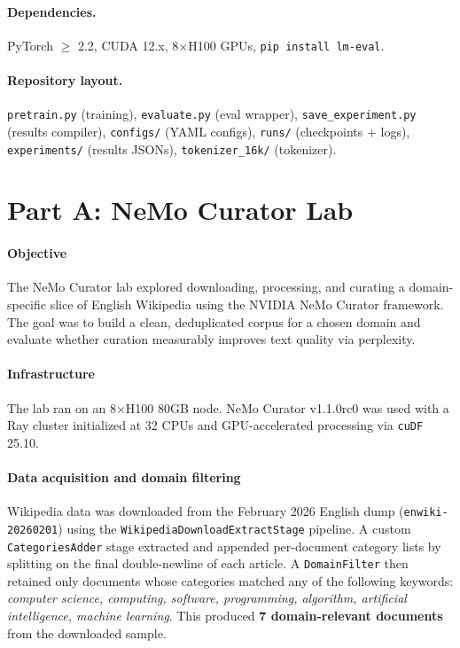 \documentclass[10pt]{article}
\begin{document}
\paragraph{Dependencies.}
PyTorch $\geq$ 2.2, CUDA 12.x, 8$\times$H100 GPUs, \texttt{pip install lm-eval}.

\paragraph{Repository layout.}
\texttt{pretrain.py} (training), \texttt{evaluate.py} (eval wrapper), \texttt{save\_experiment.py} (results compiler), \texttt{configs/} (YAML configs), \texttt{runs/} (checkpoints + logs), \texttt{experiments/} (results JSONs), \texttt{tokenizer\_16k/} (tokenizer).

\newpage
\appendix

\section{Part A: NeMo Curator Lab}
\label{app:curator}

\paragraph{Objective}
The NeMo Curator lab explored downloading, processing, and curating a domain-specific slice of English Wikipedia using the NVIDIA NeMo Curator framework. The goal was to build a clean, deduplicated corpus for a chosen domain and evaluate whether curation measurably improves text quality via perplexity.

\paragraph{Infrastructure}
The lab ran on an 8$\times$H100 80GB node. NeMo Curator v1.1.0rc0 was used with a Ray cluster initialized at 32 CPUs and GPU-accelerated processing via \texttt{cuDF} 25.10.

\paragraph{Data acquisition and domain filtering}
Wikipedia data was downloaded from the February 2026 English dump (\texttt{enwiki-20260201}) using the \texttt{WikipediaDownloadExtractStage} pipeline. A custom \texttt{CategoriesAdder} stage extracted and appended per-document category lists by splitting on the final double-newline of each article. A \texttt{DomainFilter} then retained only documents whose categories matched any of the following keywords: \textit{computer science, computing, software, programming, algorithm, artificial intelligence, machine learning}. This produced \textbf{7 domain-relevant documents} from the downloaded sample.
\end{document}
